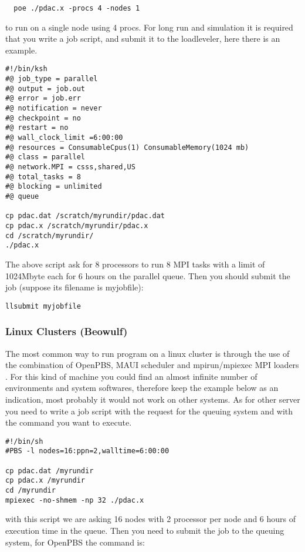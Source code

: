 \begin{verbatim}
  poe ./pdac.x -procs 4 -nodes 1 
\end{verbatim}

to run on a single node using 4 procs.
For long run and simulation it is required that you write a job script,
and submit it to the loadleveler, here there is an example.

\begin{verbatim}
#!/bin/ksh
#@ job_type = parallel
#@ output = job.out
#@ error = job.err
#@ notification = never
#@ checkpoint = no
#@ restart = no
#@ wall_clock_limit =6:00:00
#@ resources = ConsumableCpus(1) ConsumableMemory(1024 mb)
#@ class = parallel
#@ network.MPI = csss,shared,US
#@ total_tasks = 8
#@ blocking = unlimited
#@ queue

cp pdac.dat /scratch/myrundir/pdac.dat
cp pdac.x /scratch/myrundir/pdac.x
cd /scratch/myrundir/
./pdac.x
\end{verbatim}

The above script ask for 8 processors to run 8 MPI tasks
with a limit of 1024Mbyte each for 6 hours on the parallel queue.
Then you should submit the job (suppose its filename is myjobfile):

\begin{verbatim}
llsubmit myjobfile
\end{verbatim}

\subsubsection{Linux Clusters (Beowulf)}

The most common way to run program on a linux cluster 
is through the use of the combination of OpenPBS, MAUI scheduler
and mpirun/mpiexec MPI loaders .
For this kind of machine you could find an almost infinite number
of environments and system softwares, therefore keep the example below
as an indication, most probably it would not work on other systems. 
As for other server you need to write a job script with
the request for the queuing system and with the command you 
want to execute.

\begin{verbatim}
#!/bin/sh
#PBS -l nodes=16:ppn=2,walltime=6:00:00

cp pdac.dat /myrundir
cp pdac.x /myrundir
cd /myrundir
mpiexec -no-shmem -np 32 ./pdac.x
\end{verbatim}

with this script we are asking 16 nodes with 2 processor per node
and 6 hours of execution time in the queue. Then you need to
submit the job to the queuing system, for OpenPBS the command is:

